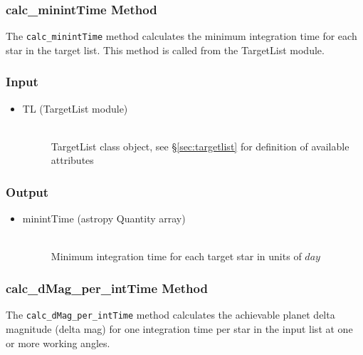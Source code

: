\documentclass[cleanfoot]{asme2ej}
\begin{document}
\subsubsection{calc\_minintTime Method} \label{sec:calcminintTimetask}
The \verb+calc_minintTime+ method calculates the minimum integration time for each star in the target list.  This method is called from the TargetList module.

\subsubsection*{Input}
\begin{itemize}
\item 
\begin{description}
    \item[TL (TargetList module)] \hfill \\ TargetList class object, see \S\ref{sec:targetlist} for definition of available attributes
\end{description}
\end{itemize}

\subsubsection*{Output}
\begin{itemize}
\item
\begin{description}
    \item[minintTime (astropy Quantity array)] \hfill \\ Minimum integration time for each target star in units of $ day $
\end{description}
\end{itemize}


\subsubsection{calc\_dMag\_per\_intTime Method} \label{sec:calcdMagperintTime}
The \verb+calc_dMag_per_intTime+ method calculates the achievable planet delta magnitude (delta mag) for one integration time per star in the input list at one or more working angles.
\end{document}
